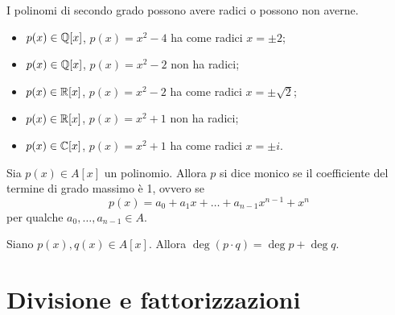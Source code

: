 \begin{remark}
    I polinomi di secondo grado possono avere radici o possono non averne.
    \begin{itemize}
        \item $p(x) \in \mathbb{Q}[x]$, $p(x) = x^2 - 4$ ha come radici $x = \pm 2$;
        \item $p(x) \in \mathbb{Q}[x]$, $p(x) = x^2 - 2$ non ha radici;
        \item $p(x) \in \mathbb{R}[x]$, $p(x) = x^2 - 2$ ha come radici $x = \pm \sqrt{2}$;
        \item $p(x) \in \mathbb{R}[x]$, $p(x) = x^2 + 1$ non ha radici;        \item $p(x) \in \mathbb{C}[x]$, $p(x) = x^2 + 1$ ha come radici $x = \pm i$.
    \end{itemize}
\end{remark}

\begin{definition}
    Sia $p(x) \in A[x]$ un polinomio. Allora $p$ si dice monico se il coefficiente del termine di grado massimo è 1, ovvero se \[
        p(x) = a_0 + a_1x + \dots + a_{n-1}x^{n-1} + x^n    
    \] per qualche $a_0, \dots, a_{n-1} \in A$.
\end{definition}

\begin{proposition}\label{grado_prodotto_somma_gradi}
    Siano $p(x), q(x) \in A[x]$. Allora $\deg (p \cdot q) = \deg p + \deg q$.
\end{proposition}

\section{Divisione e fattorizzazioni}

